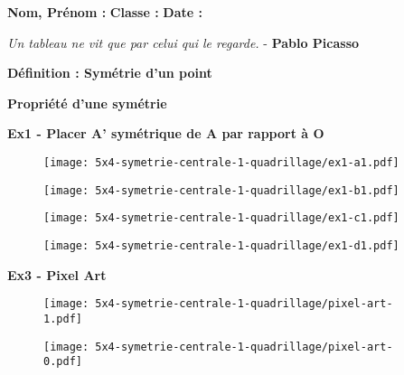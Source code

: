 



\textbf{Nom, Prénom :} \hspace{8cm} \textbf{Classe :} \hspace{3cm} \textbf{Date :}\\

\begin{center}
  \textit{Un tableau ne vit que par celui qui le regarde.} - \textbf{Pablo Picasso}
\end{center}

\textbf{Définition : Symétrie d'un point} \\ \Pointilles[3]

\textbf{Propriété d'une symétrie} \\ \Pointilles[2]

\textbf{Ex1 - Placer A' symétrique de A par rapport à O}


\begin{multicols}{2}
  
\begin{figure}[H]
  \centering
  \texttt{[image: 5x4-symetrie-centrale-1-quadrillage/ex1-a1.pdf]}
\end{figure}

\begin{figure}[H]
  \centering
  \texttt{[image: 5x4-symetrie-centrale-1-quadrillage/ex1-b1.pdf]}
\end{figure}

\begin{figure}[H]
  \centering
  \texttt{[image: 5x4-symetrie-centrale-1-quadrillage/ex1-c1.pdf]}
\end{figure}

\begin{figure}[H]
  \centering
  \texttt{[image: 5x4-symetrie-centrale-1-quadrillage/ex1-d1.pdf]}
\end{figure}

\end{multicols}

\textbf{Ex3 - Pixel Art}

\begin{multicols}{2}

\begin{figure}[H]
  \centering
  \texttt{[image: 5x4-symetrie-centrale-1-quadrillage/pixel-art-1.pdf]}
\end{figure}

\begin{figure}[H]
  \centering
  \texttt{[image: 5x4-symetrie-centrale-1-quadrillage/pixel-art-0.pdf]}
\end{figure}

\end{multicols}


